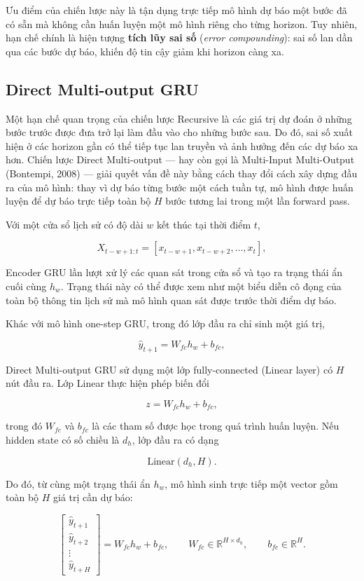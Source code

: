 \documentclass[12pt,oneside]{report}
\begin{document}
Ưu điểm của chiến lược này là tận dụng trực tiếp mô hình dự báo một bước đã có sẵn mà không cần huấn luyện một mô hình riêng cho từng horizon. Tuy nhiên, hạn chế chính là hiện tượng \textbf{tích lũy sai số} (\textit{error compounding}): sai số lan dần qua các bước dự báo, khiến độ tin cậy giảm khi horizon càng xa.

\subsection*{Direct Multi-output GRU}

Một hạn chế quan trọng của chiến lược Recursive là các giá trị dự đoán ở những bước trước được đưa trở lại làm đầu vào cho những bước sau. Do đó, sai số xuất hiện ở các horizon gần có thể tiếp tục lan truyền và ảnh hưởng đến các dự báo xa hơn. Chiến lược Direct Multi-output — hay còn gọi là Multi-Input Multi-Output (Bontempi, 2008) — giải quyết vấn đề này bằng cách thay đổi cách xây dựng đầu ra của mô hình: thay vì dự báo từng bước một cách tuần tự, mô hình được huấn luyện để dự báo trực tiếp toàn bộ $H$ bước tương lai trong một lần forward pass.

Với một cửa sổ lịch sử có độ dài $w$ kết thúc tại thời điểm $t$,

\[
X_{t-w+1:t}
=
[x_{t-w+1},x_{t-w+2},\ldots,x_t],
\]

Encoder GRU lần lượt xử lý các quan sát trong cửa sổ và tạo ra trạng thái ẩn cuối cùng $h_w$. Trạng thái này có thể được xem như một biểu diễn cô đọng của toàn bộ thông tin lịch sử mà mô hình quan sát được trước thời điểm dự báo.

Khác với mô hình one-step GRU, trong đó lớp đầu ra chỉ sinh một giá trị,

\[
\hat y_{t+1}
=
W_{fc}h_w+b_{fc},
\]

Direct Multi-output GRU sử dụng một lớp fully-connected (Linear layer) có $H$ nút đầu ra. Lớp Linear thực hiện phép biến đổi

\[
z = W_{fc}h_w + b_{fc},
\]

trong đó $W_{fc}$ và $b_{fc}$ là các tham số được học trong quá trình huấn luyện. Nếu hidden state có số chiều là $d_h$, lớp đầu ra có dạng

\[
\text{Linear}(d_h,H).
\]

Do đó, từ cùng một trạng thái ẩn $h_w$, mô hình sinh trực tiếp một vector gồm toàn bộ $H$ giá trị cần dự báo:

\begin{equation}
\begin{bmatrix}
\hat y_{t+1}\\
\hat y_{t+2}\\
\vdots\\
\hat y_{t+H}
\end{bmatrix}
=
W_{fc}h_w+b_{fc},
\qquad
W_{fc}\in\mathbb{R}^{H\times d_h},
\qquad
b_{fc}\in\mathbb{R}^{H}.
\end{equation}
\end{document}
